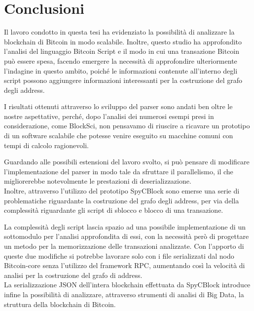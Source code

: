 \chapter{Conclusioni}\label{chap:conclusioni}

Il lavoro condotto in questa tesi ha evidenziato  la possibilità di analizzare la blockchain di Bitcoin in modo scalabile. Inoltre, questo studio ha approfondito l'analisi del linguaggio Bitcoin Script e il modo in cui una transazione Bitcoin può essere spesa, facendo emergere la necessità di approfondire ulteriormente l'indagine in questo ambito, poiché le informazioni contenute all'interno degli script possono aggiungere informazioni interessanti per la costruzione del grafo degli address.

I risultati ottenuti attraverso lo sviluppo del parser sono andati ben oltre le nostre aspettative, perché, dopo l'analisi dei numerosi esempi presi in considerazione, come BlockSci, non pensavamo di riuscire a ricavare un prototipo di un software scalabile che potesse venire eseguito su macchine comuni con tempi di calcolo ragionevoli.

Guardando alle possibili estensioni del lavoro svolto, si può pensare di modificare l'implementazione del parser in modo tale da sfruttare il parallelismo, il che  migliorerebbe notevolmente le prestazioni di deserializzazione.\\
Inoltre, attraverso l'utilizzo del prototipo SpyCBlock sono emerse una serie di problematiche riguardante la costruzione del grafo degli address, per via della complessità riguardante gli script di sblocco e blocco di una transazione.

La complessità degli script lascia spazio ad una possibile implementazione di un sottomodulo per l'analisi approfondita di essi, con la necessità però di progettare un metodo per la memorizzazione delle transazioni analizzate. Con l'apporto di queste due modifiche si potrebbe lavorare solo con i file serializzati dal nodo Bitcoin-core senza l'utilizzo del framework RPC, aumentando così la velocità di analisi per la costruzione del grafo di address.\\
La serializzazione JSON dell'intera blockchain effettuata da SpyCBlock introduce infine la  possibilità di analizzare, attraverso strumenti di analisi di Big Data, la struttura della blockchain di Bitcoin.
